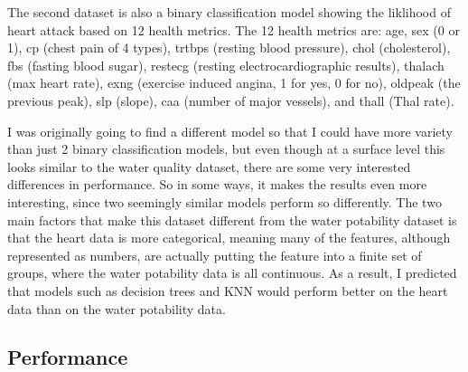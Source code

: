 \documentclass[
	letterpaper, %
]{mlreport}
\begin{document}
The second dataset is also a binary classification model showing the liklihood of heart attack based on 12 health metrics. The 12 health metrics are: age, sex (0 or 1), cp (chest pain of 4 types), trtbps (resting blood pressure), chol (cholesterol), fbs (fasting blood sugar), restecg (resting electrocardiographic results), thalach (max heart rate), exng (exercise induced angina, 1 for yes, 0 for no), oldpeak (the previous peak), slp (slope), caa (number of major vessels), and thall (Thal rate).

I was originally going to find a different model so that I could have more variety than just 2 binary classification models, but even though at a surface level this looks similar to the water quality dataset, there are some very interested differences in performance. So in some ways, it makes the results even more interesting, since two seemingly similar models perform so differently. The two main factors that make this dataset different from the water potability dataset is that the heart data is more categorical, meaning many of the features, although represented as numbers, are actually putting the feature into a finite set of groups, where the water potability data is all continuous. As a result, I predicted that models such as decision trees and KNN would perform better on the heart data than on the water potability data.

\subsection{Performance}
\end{document}
